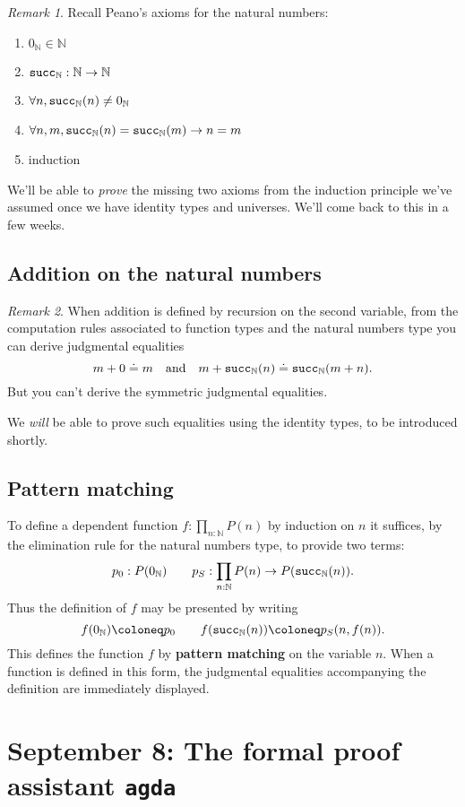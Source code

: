 \documentclass{amsart}
\theoremstyle{theorem}
\theoremstyle{definition}
\theoremstyle{remark}
\newtheorem*{rmk}{Remark}
\newcommand{\0}{\mathbbe{0}}
\newcommand{\1}{\mathbbe{1}}
\newcommand{\2}{\mathbbe{2}}
\newcommand{\3}{\mathbbe{3}}
\newcommand{\4}{\mathbbe{4}}
\newcommand{\term}[1]{{\textup{\texttt{#1}}}}
\newcommand{\bN}{{\mathbb{N}}}
\newcommand{\suc}{\term{succ}_{\bN}}
\begin{document}
\begin{rmk} Recall Peano's axioms for the natural numbers: 
\begin{enumerate}
\item $0_\bN \in \bN$
\item $\suc : \bN \to \bN$
\item $\forall n, \suc(n) \neq 0_\bN$
\item $\forall n,m, \suc(n)= \suc(m) \to n=m$
\item induction
\end{enumerate}
We'll be able to \emph{prove} the missing two axioms from the induction principle we've assumed once we have identity types and universes. We'll come back to this in a few weeks.
\end{rmk}

\subsection*{Addition on the natural numbers}

\begin{rmk} When addition is defined by recursion on the second variable, from the computation rules associated to function types and the natural numbers type you can derive judgmental equalities \[
m + 0 \doteq m \quad \text{and} \quad m + \suc(n) \doteq \suc(m + n).
\]
But you can't derive the symmetric judgmental equalities.
\end{rmk}

We \emph{will} be able to prove such equalities using the identity types, to be introduced shortly.

\subsection*{Pattern matching}

To define a dependent function $f : \prod_{n : \bN} P(n)$ by induction on $n$ it suffices, by the elimination rule for the natural numbers type, to provide two terms:
\[ p_0 : P(0_\bN) \qquad p_S : \prod_{n : \bN} P(n) \to P(\suc(n)).\]
Thus the definition of $f$ may be presented by writing
\[ f(0_\bN) \coloneq p_0 \qquad f(\suc(n)) \coloneq p_S(n,f(n)).\]
This defines the function $f$ by \textbf{pattern matching} on the variable $n$. When a function is defined in this form, the judgmental equalities accompanying the definition are immediately displayed.

\section*{September 8: The formal proof assistant \texttt{agda}}
\end{document}
